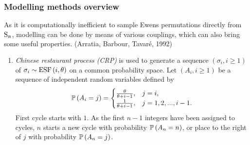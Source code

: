 \documentclass[12pt,pdf,aspectratio=169,t]{beamer}
\begin{document}
    \begin{frame}[allowframebreaks]
        \frametitle{Modelling methods overview}
        As it is computationally inefficient to sample Ewens permutations directly from $\Sym{n}$,
        modelling can be done by means of various couplings, which can also bring some useful properties. 
        (Arratia, Barbour, Tavaré, 1992)
        \begin{enumerate}
            \item \emph{Chinese restaurant process (CRP)} is used to generate a sequence 
            $\left(\sigma_i, i\geq 1\right)$ of
            $\sigma_i \sim \ESF{i, \theta}$ on a common probability space. Let $\left(A_i, i\geq 1\right)$
            be a sequence of independent random variables defined by
            \begin{gather}
                \P{A_i = j} = \begin{cases}
                    \frac{\theta}{\theta + i - 1}, & j = i, \\
                    \frac{1}{\theta + i - 1}, & j = 1, 2, ..., i-1.
                \end{cases}
            \end{gather}
            First cycle starts with $1$. As the first $n-1$ integers have been assigned to cycles,
            $n$ starts a new cycle with probability $\P{A_n = n}$, or place to the right of $j$
            with probability $\P{A_n = j}$.
            

\end{enumerate}
\end{frame}
\end{document}
